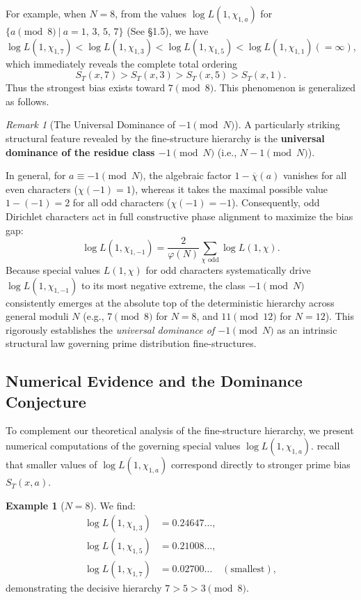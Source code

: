 \documentclass[12pt,reqno]{amsart}
\theoremstyle{definition}
\newtheorem{example}{Example}
\theoremstyle{remark}
\newtheorem{remark}[theorem]{Remark}
\numberwithin{equation}{section}
\begin{document}
For example, when $N=8$, from the values $\log L(1, \chi_{1,a})$ for $\{a\pmod 8\ |\ a=1,\,3,\,5,\,7\}$
(See \S1.5), we have
\[
\log L(1, \chi_{1,7}) < \log L(1, \chi_{1,3}) < \log L(1, \chi_{1,5}) < \log L(1, \chi_{1,1}) (= \infty),
\]
which immediately reveals the complete total ordering
\[
S_T(x, 7) > S_T(x, 3) > S_T(x, 5) > S_T(x, 1).
\]
Thus the strongest bias exists toward $7\pmod 8$. 
This phenomenon is generalized as follows. 

\begin{remark}[The Universal Dominance of $-1 \pmod N$]\label{rem:dominance_minus_one}
A particularly striking structural feature revealed by the fine-structure hierarchy is the \textbf{universal dominance of the residue class $-1 \pmod N$} (i.e., $N-1 \pmod N$). 

In general, for $a \equiv -1 \pmod N$, the algebraic factor $1 - \overline{\chi}(a)$ vanishes for all even characters ($\chi(-1) = 1$), whereas it takes the maximal possible value $1 - (-1) = 2$ for all odd characters ($\chi(-1) = -1$). Consequently, odd Dirichlet characters act in full constructive phase alignment to maximize the bias gap:
\begin{equation}
\log L(1, \chi_{1,-1}) = \frac{2}{\varphi(N)} \sum_{\chi \text{ odd}} \log L(1, \chi).
\end{equation}
Because special values $L(1, \chi)$ for odd characters systematically drive $\log L(1, \chi_{1,-1})$ to its most negative extreme, the class $-1 \pmod N$ consistently emerges at the absolute top of the deterministic hierarchy across general moduli $N$ (e.g., $7 \pmod 8$ for $N=8$, and $11 \pmod {12}$ for $N=12$). This rigorously establishes the \emph{universal dominance of $-1 \pmod N$} as an intrinsic structural law governing prime distribution fine-structures.
\end{remark}

\subsection{Numerical Evidence and the Dominance Conjecture}

To complement our theoretical analysis of the fine-structure hierarchy, we present numerical computations of the governing special values $\log L(1, \chi_{1,a})$. recall that smaller values of $\log L(1, \chi_{1,a})$ correspond directly to stronger prime bias $S_T(x, a)$.

\begin{example}[$N = 8$]
We find:
\begin{align*}
\log L(1, \chi_{1,3}) &= 0.24647\dots, \\
\log L(1, \chi_{1,5}) &= 0.21008\dots, \\
\log L(1, \chi_{1,7}) &= 0.02700\dots \quad (\text{smallest}),
\end{align*}
demonstrating the decisive hierarchy $7 > 5 > 3 \pmod 8$.
\end{example}
\end{document}
